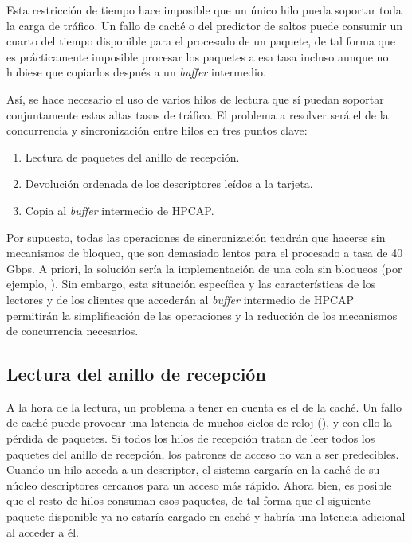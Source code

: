 \documentclass[oneside, draft]{epstfg}
\begin{document}
Esta restricción de tiempo hace imposible que un único hilo pueda soportar toda la carga de tráfico. Un fallo de caché o del predictor de saltos puede consumir un cuarto del tiempo disponible para el procesado de un paquete, de tal forma que es prácticamente imposible procesar los paquetes a esa tasa incluso aunque no hubiese que copiarlos después a un \textit{buffer} intermedio.

Así, se hace necesario el uso de varios hilos de lectura que sí puedan soportar conjuntamente estas altas tasas de tráfico. El problema a resolver será el de la concurrencia y sincronización entre hilos en tres puntos clave:

\begin{enumerate}[itemsep=0pt, topsep = 0pt]
\item Lectura de paquetes del anillo de recepción.
\item Devolución ordenada de los descriptores leídos a la tarjeta.
\item Copia al \textit{buffer} intermedio de HPCAP.
\end{enumerate}

Por supuesto, todas las operaciones de sincronización tendrán que hacerse sin mecanismos de bloqueo, que son demasiado lentos para el procesado a tasa de 40 Gbps. A priori, la solución sería la implementación de una cola sin bloqueos (por ejemplo, \cite{krizhanovsky2013lock}). Sin embargo, esta situación específica y las características de los lectores y de los clientes que accederán al \textit{buffer} intermedio de HPCAP permitirán la simplificación de las operaciones y la reducción de los mecanismos de concurrencia necesarios.

\subsection{Lectura del anillo de recepción}

A la hora de la lectura, un problema a tener en cuenta es el de la caché. Un fallo de caché puede provocar una latencia de muchos ciclos de reloj (), y con ello la pérdida de paquetes. Si todos los hilos de recepción tratan de leer todos los paquetes del anillo de recepción, los patrones de acceso no van a ser predecibles. Cuando un hilo acceda a un descriptor, el sistema cargaría en la caché de su núcleo descriptores cercanos para un acceso más rápido. Ahora bien, es posible que el resto de hilos consuman esos paquetes, de tal forma que el siguiente paquete disponible ya no estaría cargado en caché y habría una latencia adicional al acceder a él.
\end{document}
